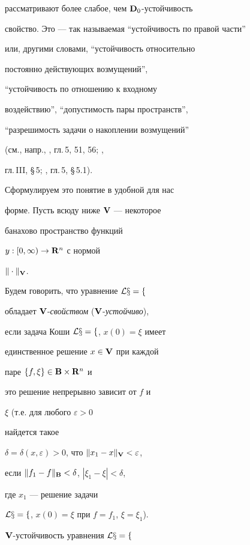 рассматривают более слабое, чем $\bold D_0$-устойчивость


свойство. Это --- так называемая ``устойчивость по правой части''


или, другими словами, ``устойчивость относительно


постоянно действующих возмущений'',


``устойчивость по отношению к входному


воздействию'', ``допустимость пары пространств'',


``разрешимость задачи о накоплении возмущений''


(см., напр., \cite{Mass}, гл.\,5, 51, 56; \cite{Bar},


гл.\,III, \S\,5; \cite{Kur}, гл.\,5, \S\,5.1).





Сформулируем это понятие в удобной для нас


форме. Пусть всюду ниже $\bold V $ --- некоторое


банахово пространство функций


$y:[0,\infty)\to\bold R ^n$ с нормой


$\|\cdot\|_{\bold V}$.





Будем говорить, что уравнение $\cal Lx=f$


обладает $\bold V $-{\it свойством} ($\bold V$-{\it устойчиво}),


если задача Коши $\cal L x=f$, $x(0)=\xi$ имеет


единственное решение $x\in\bold V $ при каждой


паре $\{f,\xi\}\in\bold B \times\bold R ^n$ и


это решение непрерывно зависит от $f$ и


$\xi$ (т.е. для любого $\varepsilon>0$


найдется такое


$\delta=\delta(x,\varepsilon)>0$, что $\|x_1 - x\|_{\bold V}<\varepsilon$,


если $\|f_1 - f\|_{\bold B}<\delta$, $|\xi_1 - \xi|<\delta$,


где $x_1$ --- решение задачи


$\cal L x=f$, $x(0)=\xi$ при $f=f_1$, $\xi=\xi_1$).








$\bold V $-устойчивость уравнения $ \cal L x=f$


